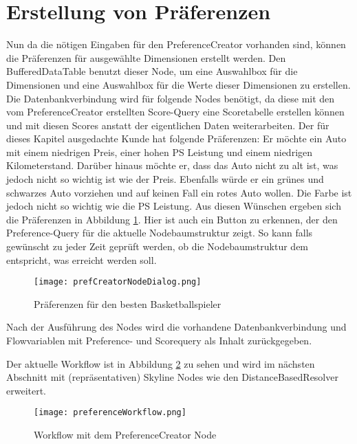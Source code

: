 \section{Erstellung von Präferenzen}
\label{ch:Evaluierung:sec:createPref}
Nun da die nötigen Eingaben für den PreferenceCreator vorhanden sind, können die Präferenzen für ausgewählte Dimensionen erstellt werden. Den BufferedDataTable benutzt dieser Node, um eine Auswahlbox für die Dimensionen und eine Auswahlbox für die Werte dieser Dimensionen zu erstellen. Die Datenbankverbindung wird für folgende Nodes benötigt, da diese mit den vom PreferenceCreator erstellten Score-Query eine Scoretabelle erstellen können und mit diesen Scores anstatt der eigentlichen Daten weiterarbeiten. 
Der für dieses Kapitel ausgedachte Kunde hat folgende Präferenzen: Er möchte ein Auto mit einem niedrigen Preis, einer hohen PS Leistung und einem niedrigen Kilometerstand. Darüber hinaus möchte er, dass das Auto nicht zu alt ist, was jedoch nicht so wichtig ist wie der Preis. Ebenfalls würde er ein grünes und schwarzes Auto vorziehen und auf keinen Fall ein rotes Auto wollen. Die Farbe ist jedoch nicht so wichtig wie die PS Leistung. Aus diesen Wünschen ergeben sich die Präferenzen in Abbildung \ref{img:useCaseNodeDialog}. Hier ist auch ein Button zu erkennen, der den Preference-Query für die aktuelle Nodebaumstruktur zeigt. So kann falls gewünscht zu jeder Zeit geprüft werden, ob die Nodebaumstruktur dem entspricht, was erreicht werden soll. 

\begin{figure}[H]
	\centering
	\texttt{[image: prefCreatorNodeDialog.png]}
	\caption{Präferenzen für den besten Basketballspieler}
	\label{img:useCaseNodeDialog}
\end{figure} 

Nach der Ausführung des Nodes wird die vorhandene Datenbankverbindung und Flowvariablen mit Preference- und Scorequery als Inhalt zurückgegeben. 

Der aktuelle Workflow ist in Abbildung \ref{img:preferenceWorkflow} zu sehen und wird im nächsten Abschnitt mit (repräsentativen) Skyline Nodes wie den DistanceBasedResolver erweitert. 

\begin{figure}[H]
	\centering
	\texttt{[image: preferenceWorkflow.png]}
	\caption{Workflow mit dem PreferenceCreator Node}
	\label{img:preferenceWorkflow}
\end{figure}  
